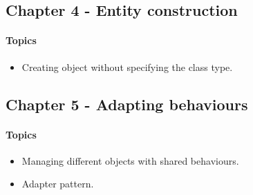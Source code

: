 \subsection{Chapter 4 - Entity construction}
\paragraph*{Topics}			
\begin{itemize}
	\item Creating object without specifying the class type.
\end{itemize}


\subsection{Chapter 5 - Adapting behaviours}
\paragraph*{Topics}			
\begin{itemize}
	\item Managing different objects with shared behaviours.
	\item Adapter pattern.
\end{itemize}